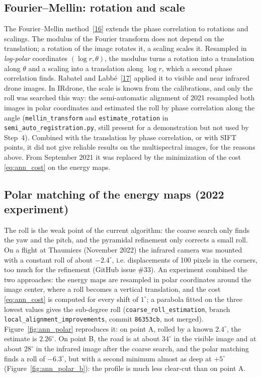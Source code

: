 \documentclass[a4paper,11pt]{report}
\begin{document}
\subsection{Fourier--Mellin: rotation and scale}
The Fourier--Mellin method~[\hyperref[ann_reddy]{16}] extends the phase correlation to rotations and scalings. The modulus of the Fourier transform does not depend on the translation; a rotation of the image rotates it, a scaling scales it. Resampled in \emph{log-polar} coordinates $(\log r, \theta)$, the modulus turns a rotation into a translation along $\theta$ and a scaling into a translation along $\log r$, which a second phase correlation finds. Rabatel and Labbé~[\hyperref[ann_rabatel]{17}] applied it to visible and near infrared drone images. In IRdrone, the scale is known from the calibrations, and only the roll was searched this way: the semi-automatic alignment of 2021 resampled both images in polar coordinates and estimated the roll by phase correlation along the angle (\texttt{mellin\_transform} and \texttt{estimate\_rotation} in \texttt{semi\_auto\_registration.py}, still present for a demonstration but not used by Step~4). Combined with the translation by phase correlation, or with SIFT points, it did not give reliable results on the multispectral images, for the reasons above. From September 2021 it was replaced by the minimization of the cost \eqref{eq:ann_cost} on the energy maps.

\subsection{Polar matching of the energy maps (2022 experiment)}
The roll is the weak point of the current algorithm: the coarse search only finds the yaw and the pitch, and the pyramidal refinement only corrects a small roll. On a flight at Thaumiers (November 2022) the infrared camera was mounted with a constant roll of about $-2.4^\circ$, i.e. displacements of 100 pixels in the corners, too much for the refinement (GitHub issue \#33). An experiment combined the two approaches: the energy maps are resampled in polar coordinates around the image center, where a roll becomes a vertical translation, and the cost \eqref{eq:ann_cost} is computed for every shift of $1^\circ$; a parabola fitted on the three lowest values gives the sub-degree roll (\texttt{coarse\_roll\_estimation}, branch \texttt{local\_alignment\_improvements}, commit \texttt{86353cb}, not merged). Figure~\ref{fig:ann_polar} reproduces it: on point A, rolled by a known $2.4^\circ$, the estimate is $2.26^\circ$. On point B, the road is at about $34^\circ$ in the visible image and at about $28^\circ$ in the infrared image after the coarse search, and the polar matching finds a roll of $-6.3^\circ$, but with a second minimum almost as deep at $+5^\circ$ (Figure~\ref{fig:ann_polar_b}): the profile is much less clear-cut than on point A.
\end{document}
